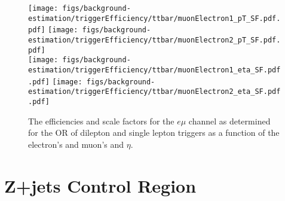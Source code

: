 \begin{figure}[ht]
\centering
\texttt{[image: figs/background-estimation/triggerEfficiency/ttbar/muonElectron1\_pT\_SF.pdf.pdf]}
\texttt{[image: figs/background-estimation/triggerEfficiency/ttbar/muonElectron2\_pT\_SF.pdf.pdf]}
\\
\texttt{[image: figs/background-estimation/triggerEfficiency/ttbar/muonElectron1\_eta\_SF.pdf.pdf]}
\texttt{[image: figs/background-estimation/triggerEfficiency/ttbar/muonElectron2\_eta\_SF.pdf.pdf]}
\caption{
The efficiencies and scale factors for the $e\mu$ channel as determined for the OR of dilepton and single lepton triggers as a function of the electron's and muon's \pT and $\eta$.
}
\label{fig:App_trigEff_emu}
\end{figure}

\section{Z+jets Control Region}\label{appSec:triggerSystPlots}

